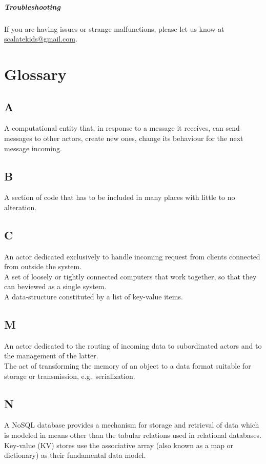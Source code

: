 \documentclass{scalatekids-article}
\begin{document}
\subparagraph{Troubleshooting}

If you are having issues or strange malfunctions, please let us know at
\href{mailto:scalatekids@gmail.com}{scalatekids@gmail.com}.

\newpage
\appendix

\section{Glossary}
\label{sec:Glossary}
\subsection{A}
 A computational entity that, in response to a message
it receives, can send messages to other actors, create new ones, change its
behaviour for the next message incoming.
\subsection{B}
 A section of code that has to be
included in many places with little to no alteration.
\subsection{C}
 An actor dedicated exclusively to handle
incoming request from clients connected from outside the system.\\

 A set of loosely or tightly connected computers that
work together, so that they can beviewed as a single system.\\

 A data-structure constituted by a list of key-value items.\\

\subsection{M}
 An actor dedicated to the routing of incoming data to subordinated
actors and to the management of the latter.\\

 The act of transforming the memory of an object to a data format suitable
for storage or transmission, e.g.\ serialization.\\

\subsection{N}
 A NoSQL database provides a mechanism for storage and retrieval
of data which is modeled in means other than the tabular relations used in
relational databases. Key-value (KV) stores use the associative array (also known
as a map or dictionary) as their fundamental data model.\\
\end{document}
